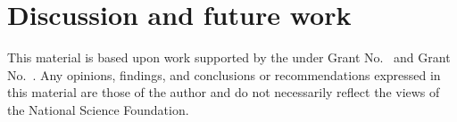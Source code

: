 \documentclass[acmlarge,anonymous]{acmart}\settopmatter{printfolios=true}
\begin{document}
\section{Discussion and future work}\label{sec-discussion}



\begin{acks}                            %
  This material is based upon work supported by the
   under Grant
  No.~ and Grant
  No.~.  Any opinions, findings, and
  conclusions or recommendations expressed in this material are those
  of the author and do not necessarily reflect the views of the
  National Science Foundation.
\end{acks}




\end{document}
